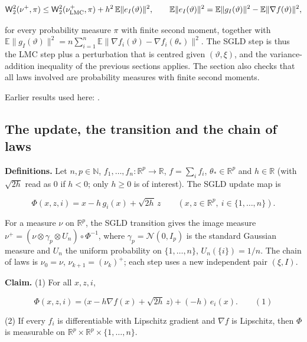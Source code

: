 \documentclass[11pt,a4paper]{report}
\begin{document}
\[\mathsf W_2^2(\nu^+,\pi)\le\mathsf W_2^2(\nu^+_{\rm LMC},\pi)+h^2\,\mathbb E\|e_I(\vartheta)\|^2,\qquad\mathbb E\|e_I(\vartheta)\|^2=\mathbb E\|g_I(\vartheta)\|^2-\mathbb E\|\nabla f(\vartheta)\|^2,\]


for every probability measure \(\pi\) with finite second moment, together with \(\mathbb E\|g_I(\vartheta)\|^2=n\sum_{i=1}^n\mathbb E\|\nabla f_i(\vartheta)-\nabla f_i(\theta_*)\|^2\). The SGLD step is thus the LMC step plus a perturbation that is centred given \((\vartheta,\xi)\), and the variance-addition inequality of the previous sections applies. The section also checks that all laws involved are probability measures with finite second moments.



Earlier results used here: \cite[Section~3.10]{LangevinLean2026ULALSI}.
\subsection{\texorpdfstring{The update, the transition and the chain of laws}{The update, the transition and the chain of laws}}
\label{report-step-AverageLMC-SGLDLaw-lean-1}


\textbf{Definitions.} Let \(n,p\in\mathbb N\), \(f_1,\dots,f_n:\mathbb R^p\to\mathbb R\), \(f=\sum_if_i\), \(\theta_*\in\mathbb R^p\) and \(h\in\mathbb R\) (with \(\sqrt{2h}\) read as \(0\) if \(h<0\); only \(h\ge0\) is of interest). The SGLD update map is


\[\Phi(x,z,i)=x-h\,g_i(x)+\sqrt{2h}\,z\qquad(x,z\in\mathbb R^p,\ i\in\{1,\dots,n\}).\]


For a measure \(\nu\) on \(\mathbb R^p\), the SGLD transition gives the image measure \(\nu^+=(\nu\otimes\gamma_p\otimes U_n)\circ\Phi^{-1}\), where \(\gamma_p=\mathcal N(0,I_p)\) is the standard Gaussian measure and \(U_n\) the uniform probability on \(\{1,\dots,n\}\), \(U_n(\{i\})=1/n\). The chain of laws is \(\nu_0=\nu\), \(\nu_{k+1}=(\nu_k)^+\); each step uses a new independent pair \((\xi,I)\).




\textbf{Claim.} (1) For all \(x,z,i\),


\[\Phi(x,z,i)=\bigl(x-h\nabla f(x)+\sqrt{2h}\,z\bigr)+(-h)\,e_i(x).\qquad(1)\]


(2) If every \(f_i\) is differentiable with Lipschitz gradient and \(\nabla f\) is Lipschitz, then \(\Phi\) is measurable on \(\mathbb R^p\times\mathbb R^p\times\{1,\dots,n\}\).
\end{document}
